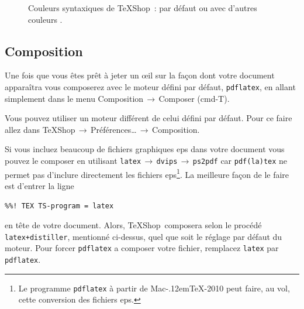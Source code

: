 \documentclass[11pt,french]{article}
\newcommand{\MacTeX}{Mac\kern-.12em\TeX}
\newcommand{\TS}{\textsf{\TeX Shop}}
\newcommand{\acr}[1]{\textsf{#1}}
\newcommand{\cmd}[1]{\textsf{#1}}
\newcommand{\mnu}[1]{\textsf{#1}}
\newcommand{\To}{\,\(\to\)\,}
\begin{document}

\begin{figure}
\centering
{}%
\qquad%
%
\caption[Couleurs syntaxiques de \TS]{Couleurs syntaxiques de \TS\ : par défaut  ou avec d'autres couleurs .}
\label{fig:SyntaxColors}
\end{figure}

%
\subsection{Composition}

Une fois que vous êtes prêt à jeter un \oe{}il sur la façon dont votre document apparaîtra vous composerez avec le moteur défini par défaut, \texttt{pdflatex}, en allant simplement dans le menu \mnu{Composition}\To\mnu{Composer} (\cmd{cmd-T}).

Vous pouvez utiliser un moteur différent de celui défini par défaut. Pour ce faire allez dans \mnu{TeXShop}\To\mnu{Préférences…}\To\mnu{Composition}.

Si vous incluez beaucoup de fichiers graphiques \acr{eps} dans votre document vous pouvez le composer en utilisant \texttt{latex}\To\texttt{dvips}\To\texttt{ps2pdf} car \texttt{pdf(la)tex} ne permet pas d'inclure directement les fichiers \acr{eps}\footnote{Le programme \texttt{pdflatex} à partir de \MacTeX-2010 peut faire, au vol, cette conversion des fichiers \acr{eps}.}. La meilleure façon de le faire est d'entrer la ligne
\begin{verbatim}
%%! TEX TS-program = latex
\end{verbatim}
en tête de votre document. Alors, \TS\ composera selon le procédé \texttt{latex+distiller}, mentionné ci-dessus, quel que soit le réglage par défaut du moteur. Pour forcer \texttt{pdflatex} a composer votre fichier, remplacez \texttt{latex} par \texttt{pdflatex}.
\end{document}
